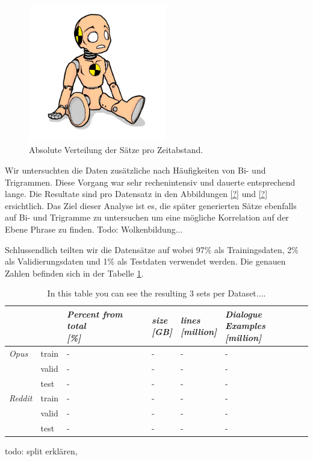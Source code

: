 \begin{figure}[h]
	\label{fig:data:analyse:timediff:opus}
	\centering
	\includegraphics[width=6cm]{img/dummy.png}
	\caption{Absolute Verteilung der Sätze pro Zeitabstand. \protect\footnotemark}
\end{figure}


Wir untersuchten die Daten zusätzliche nach Häufigkeiten von Bi- und Trigrammen. Diese Vorgang war sehr rechenintensiv und dauerte entsprechend lange. Die Resultate sind pro Datensatz in den Abbildungen \ref{?} und \ref{?} ersichtlich. Das Ziel dieser Analyse ist es, die später generierten Sätze ebenfalls auf Bi- und Trigramme zu untersuchen um eine mögliche Korrelation auf der Ebene Phrase zu finden.
Todo: Wolkenbildung...

Schlussendlich teilten wir die Datensätze auf wobei 97\% als Trainingsdaten, 2\% als Validierungsdaten und 1\% als Testdaten verwendet werden. Die genauen Zahlen befinden sich in der Tabelle \ref{tbl:data:split:corpus}.
\begin{table}[H]
	\begin{adjustbox}{max width=\textwidth}
	\centering
	\small
	\begin{tabular}{llllll}
		\toprule
		&  \specialcell{\emph{set}}
		&  \specialcell{\emph{Percent from total} \\\textit{[\%]}}
		&  \specialcell{\emph{size} \\\textit{[GB]}}
		&  \specialcell{\emph{lines} \\\textit{[million]}}
		&  \specialcell{\emph{Dialogue Examples} \\\textit{[million]}}\\
		\midrule
		\emph{Opus}			&train	&-	&-	&-	&-	\\
							&valid	&-	&-	&-	&-	\\
							&test	&-	&-	&-	&-	\\
		\emph{Reddit}		&train	&-	&-	&-	&-	\\
							&valid	&-	&-	&-	&-	\\
							&test	&-	&-	&-	&-	\\
		\bottomrule
	\end{tabular}
	\end{adjustbox}
	\caption{In this table you can see the resulting 3 sets per Dataset....}
	\label{tbl:data:split:corpus}
\end{table}
todo: split erklären, 


